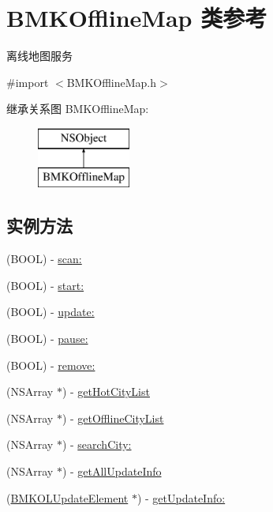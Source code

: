 \hypertarget{interface_b_m_k_offline_map}{\section{B\-M\-K\-Offline\-Map 类参考}
\label{interface_b_m_k_offline_map}
}


离线地图服务  




{\ttfamily \#import $<$B\-M\-K\-Offline\-Map.\-h$>$}

继承关系图 B\-M\-K\-Offline\-Map\-:\begin{figure}[H]
\begin{center}
\leavevmode
\includegraphics[height=2.000000cm]{interface_b_m_k_offline_map}
\end{center}
\end{figure}
\subsection*{实例方法}
\begin{DoxyCompactItemize}
\item 
(B\-O\-O\-L) -\/ \hyperlink{interface_b_m_k_offline_map_a2074d1fd832b6e5c84ab6b1c438a3b1f}{scan\-:}
\item 
(B\-O\-O\-L) -\/ \hyperlink{interface_b_m_k_offline_map_a40aa794e96677e472bf0d6f2ac18d583}{start\-:}
\item 
(B\-O\-O\-L) -\/ \hyperlink{interface_b_m_k_offline_map_a4c2489e1502d34bd807a1c4418560f88}{update\-:}
\item 
(B\-O\-O\-L) -\/ \hyperlink{interface_b_m_k_offline_map_a9c601d81b148c729342863db92b47831}{pause\-:}
\item 
(B\-O\-O\-L) -\/ \hyperlink{interface_b_m_k_offline_map_ac834ae7e577d2fa4dc864232b30f02df}{remove\-:}
\item 
(N\-S\-Array $\ast$) -\/ \hyperlink{interface_b_m_k_offline_map_a35c1c36472716ec22cacd54c5c710a5e}{get\-Hot\-City\-List}
\item 
(N\-S\-Array $\ast$) -\/ \hyperlink{interface_b_m_k_offline_map_a9a78b1a176ea59abe1b26e237a6e3a2c}{get\-Offline\-City\-List}
\item 
(N\-S\-Array $\ast$) -\/ \hyperlink{interface_b_m_k_offline_map_a9447d5aed62366152b3b6978b9fc1d34}{search\-City\-:}
\item 
(N\-S\-Array $\ast$) -\/ \hyperlink{interface_b_m_k_offline_map_a3152e5d5076958cda782d20565ceea56}{get\-All\-Update\-Info}
\item 
(\hyperlink{interface_b_m_k_o_l_update_element}{B\-M\-K\-O\-L\-Update\-Element} $\ast$) -\/ \hyperlink{interface_b_m_k_offline_map_ab11a98584ffd1f5582a2439a794646cb}{get\-Update\-Info\-:}
\end{DoxyCompactItemize}
